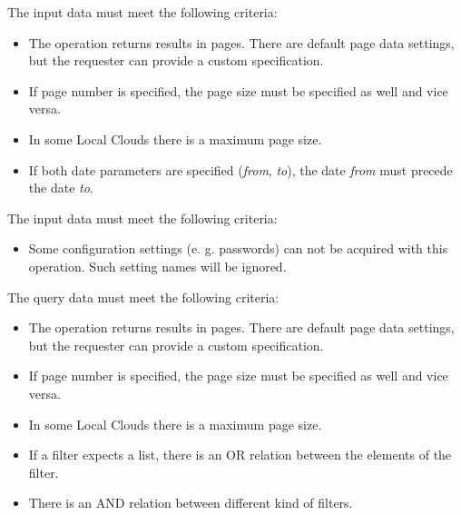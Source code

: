 \documentclass[a4paper]{arrowhead}
\begin{document}
{}

The input data must meet the following criteria:

\begin{itemize}
    \item The operation returns results in pages. There are default page data settings, but the requester can provide a custom specification.
    \item If page number is specified, the page size must be specified as well and vice versa.
    \item In some Local Clouds there is a maximum page size.
    \item If both date parameters are specified (\textit{from}, \textit{to}), the date \textit{from} must precede the date \textit{to}.
\end{itemize}


The input data must meet the following criteria:

\begin{itemize}
    \item Some configuration settings (e. g. passwords) can not be acquired with this operation. Such setting names will be ignored.
\end{itemize}


The query data must meet the following criteria:

\begin{itemize}
    \item The operation returns results in pages. There are default page data settings, but the requester can provide a custom specification.
    \item If page number is specified, the page size must be specified as well and vice versa.
    \item In some Local Clouds there is a maximum page size.
    \item If a filter expects a list, there is an OR relation between the elements of the filter.
    \item There is an AND relation between different kind of filters.
\end{itemize}

\end{document}
